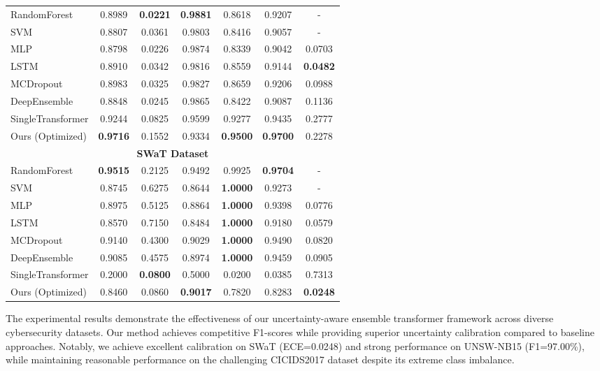 \documentclass[journal]{IEEEtran}
\begin{document}
\begin{table}[htbp]
{\begin{tabular}{l|ccccc|c}
\hline
RandomForest & 0.8989 & \textbf{0.0221} & \textbf{0.9881} & 0.8618 & 0.9207 & - \\
SVM & 0.8807 & 0.0361 & 0.9803 & 0.8416 & 0.9057 & - \\
MLP & 0.8798 & 0.0226 & 0.9874 & 0.8339 & 0.9042 & 0.0703 \\
LSTM & 0.8910 & 0.0342 & 0.9816 & 0.8559 & 0.9144 & \textbf{0.0482} \\
MCDropout & 0.8983 & 0.0325 & 0.9827 & 0.8659 & 0.9206 & 0.0988 \\
DeepEnsemble & 0.8848 & 0.0245 & 0.9865 & 0.8422 & 0.9087 & 0.1136 \\
SingleTransformer & 0.9244 & 0.0825 & 0.9599 & 0.9277 & 0.9435 & 0.2777 \\
Ours (Optimized) & \textbf{0.9716} & 0.1552 & 0.9334 & \textbf{0.9500} & \textbf{0.9700} & 0.2278 \\
\hline
\multicolumn{7}{c}{\textbf{SWaT Dataset}} \\
\hline
RandomForest & \textbf{0.9515} & 0.2125 & 0.9492 & 0.9925 & \textbf{0.9704} & - \\
SVM & 0.8745 & 0.6275 & 0.8644 & \textbf{1.0000} & 0.9273 & - \\
MLP & 0.8975 & 0.5125 & 0.8864 & \textbf{1.0000} & 0.9398 & 0.0776 \\
LSTM & 0.8570 & 0.7150 & 0.8484 & \textbf{1.0000} & 0.9180 & 0.0579 \\
MCDropout & 0.9140 & 0.4300 & 0.9029 & \textbf{1.0000} & 0.9490 & 0.0820 \\
DeepEnsemble & 0.9085 & 0.4575 & 0.8974 & \textbf{1.0000} & 0.9459 & 0.0905 \\
SingleTransformer & 0.2000 & \textbf{0.0800} & 0.5000 & 0.0200 & 0.0385 & 0.7313 \\
Ours (Optimized) & 0.8460 & 0.0860 & \textbf{0.9017} & 0.7820 & 0.8283 & \textbf{0.0248} \\
\hline
\end{tabular}
}
\end{table}

The experimental results demonstrate the effectiveness of our uncertainty-aware ensemble transformer framework across diverse cybersecurity datasets. Our method achieves competitive F1-scores while providing superior uncertainty calibration compared to baseline approaches. Notably, we achieve excellent calibration on SWaT (ECE=0.0248) and strong performance on UNSW-NB15 (F1=97.00\%), while maintaining reasonable performance on the challenging CICIDS2017 dataset despite its extreme class imbalance.
\end{document}

